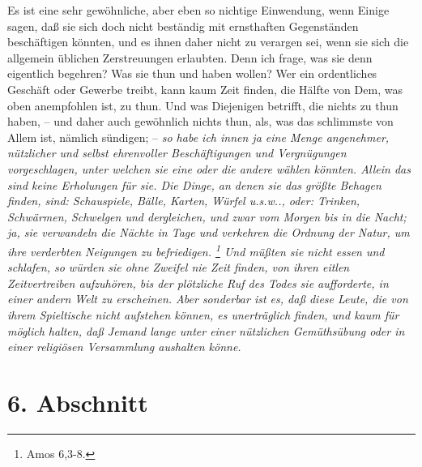 \medskip

Es ist eine sehr gewöhnliche, aber eben so nichtige Einwendung, wenn Einige
sagen, daß sie sich doch nicht beständig mit ernsthaften Gegenständen
beschäftigen könnten, und es ihnen daher nicht zu verargen sei, wenn sie sich
die allgemein üblichen Zerstreuungen erlaubten. Denn ich frage, was sie denn
eigentlich begehren? Was sie thun und haben wollen? Wer ein ordentliches
Geschäft oder Gewerbe treibt, kann kaum Zeit finden, die Hälfte von Dem, was
oben anempfohlen ist, zu thun. Und was Diejenigen betrifft, die nichts zu thun
haben, -- und daher auch gewöhnlich nichts thun, als, was das schlimmste von
Allem ist, nämlich sündigen; -- \textit{so habe ich innen ja eine Menge angenehmer,
nützlicher und selbst ehrenvoller Beschäftigungen und Vergnügungen
vorgeschlagen, unter welchen sie eine oder die andere wählen könnten. Allein das
sind keine Erholungen für sie. Die Dinge, an denen sie das größte Behagen
finden, sind: Schauspiele, Bälle, Karten, Würfel u.s.w.., oder: Trinken,
Schwärmen, Schwelgen und dergleichen, und zwar vom Morgen bis in die Nacht; ja,
sie verwandeln die Nächte in Tage und verkehren die Ordnung der Natur, um ihre
verderbten Neigungen zu befriedigen.
\footnote{Amos 6,3-8.}
Und müßten sie nicht
essen und schlafen, so würden sie ohne Zweifel nie Zeit finden, von ihren eitlen
Zeitvertreiben aufzuhören, bis der plötzliche Ruf des Todes sie aufforderte, in
einer andern Welt zu erscheinen. Aber sonderbar ist es, daß diese Leute, die von
ihrem Spieltische nicht aufstehen können, es unerträglich finden, und kaum für
möglich halten, daß Jemand lange unter einer nützlichen Gemüthsübung oder in
einer religiösen Versammlung aushalten könne.}

\section{6. Abschnitt} \label{kap15_ab6}

